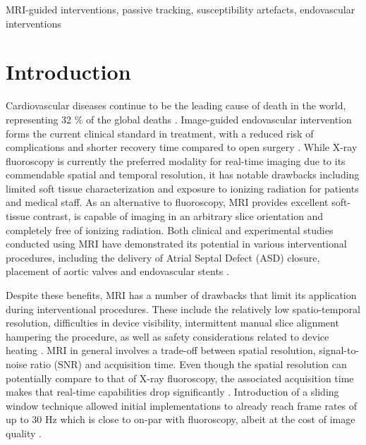 \documentclass[conference]{IEEEtran}
\begin{document}
\begin{IEEEkeywords}
MRI-guided interventions, passive tracking, susceptibility artefacts, endovascular interventions
\end{IEEEkeywords}

\section{Introduction}
Cardiovascular diseases continue to be the leading cause of death in the world, representing 32 \% of the global deaths \cite{webcardio}. Image-guided endovascular intervention forms the current clinical standard in treatment, with a reduced risk of complications and shorter recovery time compared to open surgery \cite{Jung2018}. While X-ray fluoroscopy is currently the preferred modality for real-time imaging due to its commendable spatial and temporal resolution, it has notable drawbacks including limited soft tissue characterization and exposure to ionizing radiation for patients and medical staff. As an alternative to fluoroscopy, MRI provides excellent soft-tissue contrast, is capable of imaging in an arbitrary slice orientation and completely free of ionizing radiation. Both clinical and experimental studies conducted using MRI have demonstrated its potential in various interventional procedures, including the delivery of Atrial Septal Defect (ASD) closure, placement of aortic valves and endovascular stents \cite{pmid21359519}.

Despite these benefits, MRI has a number of drawbacks that limit its application during interventional procedures. These include the relatively low spatio-temporal resolution, difficulties in device visibility, intermittent manual slice alignment hampering the procedure, as well as safety considerations related to device heating \cite{pmid35420239}. MRI in general involves a trade-off between spatial resolution, signal-to-noise ratio (SNR) and acquisition time. Even though the spatial resolution can potentially compare to that of X-ray fluoroscopy, the associated acquisition time makes that real-time capabilities drop significantly \cite{Green2005}. Introduction of a sliding window technique allowed initial implementations to already reach frame rates of up to 30 Hz which is close to on-par with fluoroscopy, albeit at the cost of image quality \cite{pmid3173063}. %
\end{document}
